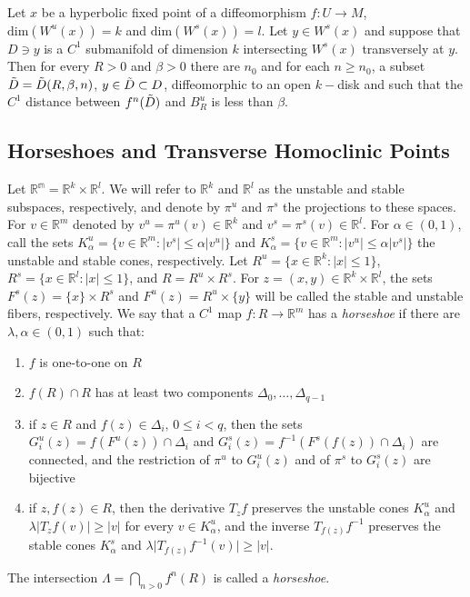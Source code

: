 \begin{thm}
Let $x$ be a hyperbolic fixed point of a diffeomorphism $f:U \to M$, $\mathrm{dim}(W^u(x))=k$ and $\mathrm{dim}(W^s(x))=l$. Let $y \in W^s(x)$ and suppose that $D \ni y$ is a $C^1$ submanifold of dimension $k$ intersecting $W^s(x)$ transversely at $y$. \\
\indent Then for every $R > 0$ and $\beta > 0$ there are $n_0$ and for each $n \geq n_0$, a subset $\Tilde{D}=\Tilde{D}(R,\beta,n)$, $y \in \Tilde{D} \subset D$, diffeomorphic to an open $k-$disk and such that the $C^1$ distance between $f^n(\Tilde{D})$ and $B^u_R$ is less than $\beta$.

\end{thm}

\subsection{Horseshoes and Transverse Homoclinic Points}

Let $\mathbb{R^m}= \mathbb{R}^k \times \mathbb{R}^l$. We will refer to $\mathbb{R}^k$ and $\mathbb{R}^l$ as the unstable and stable subspaces, respectively, and denote by $\pi^u$ and $\pi^s$ the projections to these spaces. For $v \in \mathbb{R}^m$ denoted by $v^u = \pi^u(v) \in \mathbb{R}^k$ and $v^s = \pi^s(v) \in \mathbb{R}^l$. For $\alpha \in (0,1)$, call the sets $K^u_{\alpha} = \{ v \in \mathbb{R}^m: \vert v^s \vert \leq \alpha \vert v^u \vert \}$ and $K^s_{\alpha} = \{ v \in \mathbb{R}^m: \vert v^u \vert \leq \alpha \vert v^s \vert \}$ the unstable and stable cones, respectively. Let $R^u = \{ x \in \mathbb{R}^k: \vert x \vert \leq 1 \}$, $R^s = \{ x \in \mathbb{R}^l : \vert x \vert \leq 1 \} $, and $R = R^u \times R^s$. For $z = (x,y) \in \mathbb{R}^k \times \mathbb{R}^l$, the sets $F^s(z) = \{x \} \times R^s$ and $F^u(z) = R^u \times \{y\}$ will be called the stable and unstable fibers, respectively. We say that a $C^1$ map $f:R \to \mathbb{R}^m$ has a \textit{horseshoe} if there are $\lambda, \alpha \in (0,1)$ such that:

\begin{enumerate}
    \item $f$ is one-to-one on $R$
    \item $f(R) \cap R$ has at least two components $\Delta_0, \ldots, \Delta_{q-1}$
    \item if $z \in R$ and $f(z) \in \Delta_i, \hspace{2pt} 0 \leq i < q$, then the sets $G^u_i(z) = f(F^u(z)) \cap \Delta_i$ and $G^s_i(z) = f^{-1}(F^s(f(z)) \cap \Delta_i)$ are connected, and the restriction of $\pi^u$ to $G^u_i(z)$ and of $\pi^s$ to $G^s_i(z)$ are bijective
    \item if $z, f(z) \in R$, then the derivative $T_zf$ preserves the unstable cones $K^u_{\alpha}$ and $\lambda \vert T_zf (v) \vert \geq \vert v \vert$ for every $v \in K^u_{\alpha}$, and the inverse $T_{f(z)}f^{-1}$ preserves the stable cones $K^s_{\alpha}$ and $\lambda \vert T_{f(z)}f^{-1}(v) \vert \geq \vert v \vert$.
\end{enumerate}
The intersection $\Lambda=\bigcap_{n>0}f^n(R)$ is called a \textit{horseshoe}.

